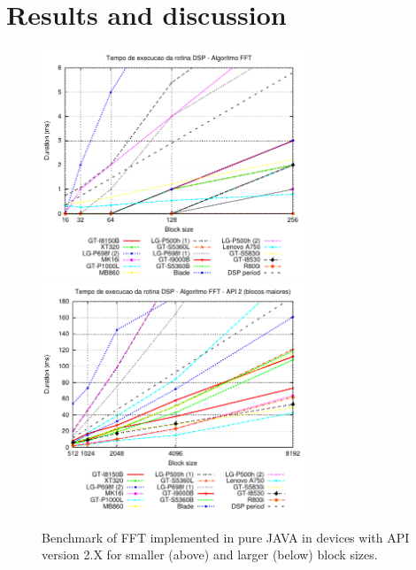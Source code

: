 \documentclass[12pt]{article}
\begin{document}
\section{Results and discussion}



\begin{figure}[h!]
\begin{center}
\includegraphics[width=0.7\textwidth]{img/FFT_ALGORITHM-2-a.pdf}
\includegraphics[width=0.7\textwidth]{img/FFT_ALGORITHM-2-b.pdf}
\end{center}
\caption{Benchmark of FFT implemented in pure JAVA in devices with API version
2.X for smaller (above) and larger (below) block sizes.}
\label{fig:alg-fft}
\end{figure}
\end{document}
